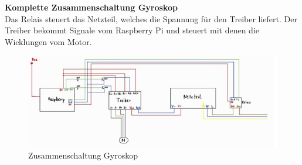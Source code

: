 \textbf{Komplette Zusammenschaltung Gyroskop}\\
\vspace{3mm}
Das Relais steuert das Netzteil, welches die Spannung für den Treiber liefert. Der Treiber bekommt Signale vom Raspberry Pi und steuert mit denen die Wicklungen vom Motor. \\
\vspace{3mm}
\begin{figure}[H]
    \centering
    \includegraphics{image/zusammengyros.jpg}
    \caption{Zusammenschaltung Gyroskop}
    \label{fig:enter-label}
\end{figure}





\newpage

